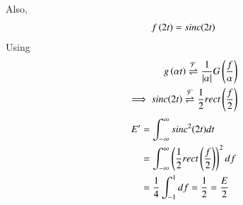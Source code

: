 Also, 
\begin{align}
    f\left(2t\right) = sinc{\left(2t\right)}
\end{align}
Using \begin{align}
    \label{scale} g\left(\alpha t\right) \overset{\mathcal{F}}{ \rightleftharpoons} \frac{1}{\left\vert\alpha\right\vert}G\left(\frac{f}{\alpha}\right)\\
    \implies sinc{\left(2t\right)} \overset{\mathcal{F}}{ \rightleftharpoons}\frac{1}{2}rect\left(\frac{f}{2}\right)
\end{align}
\begin{align}
    E' &= \int_{-\infty}^{\infty} sinc^2{\left(2t\right)}  dt \\
    &= \int_{-\infty}^{\infty} \left(\frac{1}{2}rect\left(\frac{f}{2}\right)\right)^2 df \\
    &= \frac{1}{4}\int_{-1}^{1} df = \frac{1}{2} = \frac{E}{2}
\end{align}

